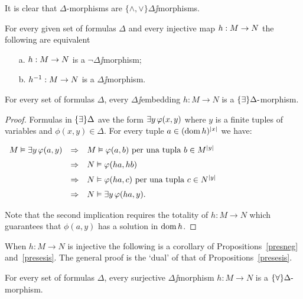 \documentclass[creche.tex]{subfiles}
\begin{document}
It is clear that $\Delta$-morphisms are  $\{\wedge,\vee\}\Delta\jj$morphisms.

\begin{proposition}\label{presneg}
For every given set of formulas $\Delta$ and every injective map $h:M\rightarrow N$ the following are equivalent
\begin{itemize}
\item[a.] $h:M\rightarrow N$ is a $\neg\Delta\jj$morphism;
\item[b.] $h^{-1}:M\rightarrow N$ is a $\Delta\jj$morphism.\QED
\end{itemize}
\end{proposition}

\begin{proposition}\label{presesis}
For every set of formulas $\Delta$, every $\Delta\jj$embedding $h:M\to N$ is a $\{\exists\}\Delta\mbox{-}$mor\-phism.
\end{proposition}
\begin{proof}
Formulas in $\{\exists\}\Delta$ ave the form $\exists y\,\varphi(x,y)$ where $y$ is a finite tuples of variables and  $\phi(x,y)\in\Delta$. For every tuple $a\in(\mathop{\rm dom} h)^{|x|}$ we have:

\hfil
$\begin{array}{rcl}
M\models\E y\,\phi(a,y) %
&\IMP& M\models\phi(a,b)\textrm{ per una tupla } b\in M^{|y|}  \\[2mm]
&\IMP& N\models\phi(ha,hb) \\[2mm]
&\IMP& N\models\phi(ha,c)\textrm{ per una tupla } c\in N^{|y|}  \\[2mm]
&\IMP& N\models\E y\,\phi(ha,y).\\
\end{array}$

Note that the second implication requires the totality of  $h:M\to N$ which guarantees that $\phi(a,y)$ has a solution in $\mathop{\rm dom} h$.
\end{proof}

When $h:M\to N$ is injective the following is a corollary of Propositions~\ref{presneg} and~\ref{presesis}. The general proof is the `dual' of that of Propositions~\ref{presesis}.

\begin{proposition}\label{presuniv}
For every set of formulas $\Delta$, every surjective $\Delta\jj$morphism $h:M\to N$ is a $\{\forall\}\Delta\mbox{-}$mor\-phism.\QED
\end{proposition}
\end{document}
